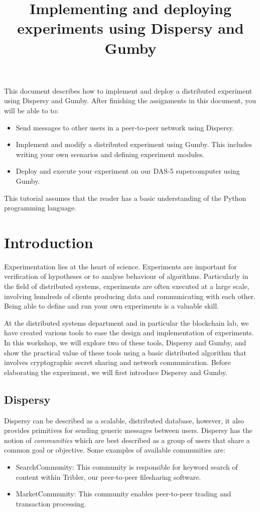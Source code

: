 \documentclass{article}
\title{Implementing and deploying experiments using Dispersy and Gumby}
\begin{document}
\maketitle

This document describes how to implement and deploy a distributed experiment using Dispersy and Gumby.
After finishing the assignments in this document, you will be able to to:
\begin{itemize}
	\item Send messages to other users in a peer-to-peer network using Dispersy.
	\item Implement and modify a distributed experiment using Gumby. This includes writing your own scenarios and defining experiment modules.
	\item Deploy and execute your experiment on our DAS-5 supercomputer using Gumby.
\end{itemize}

This tutorial assumes that the reader has a basic understanding of the Python programming language.

\section{Introduction}
Experimentation lies at the heart of science. Experiments are important for verification of hypotheses or to analyse behaviour of algorithms.
Particularly in the field of distributed systems, experiments are often executed at a large scale, involving hundreds of clients producing data and communicating with each other.
Being able to define and run your own experiments is a valuable skill.

At the distributed systems department and in particular the blockchain lab, we have created various tools to ease the design and implementation of experiments. In this workshop, we will explore two of these tools, Dispersy and Gumby, and show the practical value of these tools using a basic distributed algorithm that involves cryptographic secret sharing and network communication.
Before elaborating the experiment, we will first introduce Dispersy and Gumby.

\subsection{Dispersy}
Dispersy can be described as a scalable, distributed database, however, it also provides primitives for sending generic messages between users.
Dispersy has the notion of \emph{communities} which are best described as a group of users that share a common goal or objective.
Some examples of available communities are:
\begin{itemize}
	\item SearchCommunity: This community is responsible for keyword search of content within Tribler, our peer-to-peer filesharing software.
	\item MarketCommunity: This community enables peer-to-peer trading and transaction processing.
\end{itemize}
\end{document}
